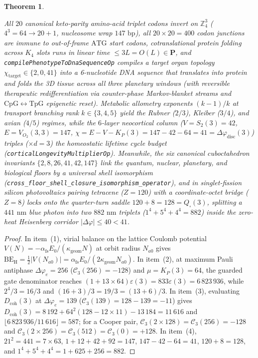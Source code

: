 \documentclass[11pt,a4paper]{article}
\theoremstyle{plain}
\newtheorem{theorem}{Theorem}[section]
\theoremstyle{definition}
\begin{document}
\begin{theorem}
\begin{enumerate}[label=\textbf{(\arabic*)},leftmargin=*]
  All $20$ canonical keto-parity amino-acid triplet codons invert on $\mathbb{Z}_4^3$ ($4^3 = 64 \to 20 + 1$, nucleosome wrap $147\text{ bp}$), all $20\times 20 = 400$ codon junctions are immune to out-of-frame $\mathrm{ATG}$ start codons, cotranslational protein folding across $K_4$ slots runs in linear time $\le 3L = O(L) \in \mathbf{P}$, and \texttt{compilePhenotypeToDnaSequenceOp} compiles a target organ topology $\chi_{\mathrm{target}} \in \{2, 0, 41\}$ into a 6-nucleotide DNA sequence that translates into protein and folds the 3D tissue across all three planetary windows (with reversible therapeutic redifferentiation via counter-phase Markov-blanket streams and $\mathrm{CpG} \leftrightarrow \mathrm{TpG}$ epigenetic reset). Metabolic allometry exponents $(k - 1)/k$ at transport branching rank $k \in \{3, 4, 5\}$ yield the Rubner ($2/3$), Kleiber ($3/4$), and avian ($4/5$) regimes, while the $6$-layer neocortical column ($V = S_2(3) = 42$, $E = V_{O_2}(3,3) = 147$, $\chi = E - V - K_P(3) = 147 - 42 - 64 = 41 = \Delta\varphi_{\mathrm{disc}}(3)$) triples ($\times d = 3$) the homeostatic lifetime cycle budget (\texttt{corticalLongevityMultiplierOp}). Meanwhile, the six canonical cuboctahedron invariants $\{2, 8, 26, 41, 42, 147\}$ link the quantum, nuclear, planetary, and biological floors by a universal shell isomorphism (\texttt{cross\_floor\_shell\_closure\_isomorphism\_operator}), and in singlet-fission silicon photovoltaics pairing tetracene ($Z = 120$) with a coordinate-octet bridge ($Z = 8$) locks onto the quarter-turn saddle $120 + 8 = 128 = Q_\square(3)$, splitting a $441\text{ nm}$ blue photon into two $882\text{ nm}$ triplets ($1^4 + 5^4 + 4^4 = 882$) inside the zero-heat Heisenberg corridor $|\Delta\varphi| \le 40 < 41$.
\end{enumerate}
\end{theorem}

\begin{proof}
In item~(1), virial balance on the lattice Coulomb potential $V(N) = -\alpha_{\mathrm{fs}} E_0 / (\kappa_{\mathrm{geom}} N)$ at orbit radius $N_{a0}$ gives $\mathrm{BE}_{\mathrm{H}} = \frac{1}{2}|V(N_{a0})| = \alpha_{\mathrm{fs}} E_0 / (2\kappa_{\mathrm{geom}} N_{a0})$. In item~(2), at maximum Pauli antiphase $\Delta\varphi_e = 256$ ($\mathcal{C}_3(256) = -128$) and $\mu = K_P(3) = 64$, the guarded gate denominator reaches $(1 + 13\times 64)\varepsilon(3) = 833\varepsilon(3) = 6\,823\,936$, while $2^4 / 3 = 16/3$ and $(16 + 3)/3 = 19/3 = (13 + 6)/3$. In item~(3), evaluating $D_{\mathrm{coh}}(3)$ at $\Delta\varphi_e = 139$ ($\mathcal{C}_3(139) = 128 - 139 = -11$) gives $D_{\mathrm{coh}}(3) = 8\,192 + 64^2(128 - 12\times 11) - 13\,184 = 11\,616$ and $\lfloor 6\,823\,936 / 11\,616\rfloor = 587$; for a Cooper pair, $\mathcal{C}_3(2\times 128) = \mathcal{C}_3(256) = -128$ and $\mathcal{C}_3(2\times 256) = \mathcal{C}_3(512) = \mathcal{C}_3(0) = +128$. In item~(4), $21^2 = 441 = 7\times 63$, $1 + 12 + 42 + 92 = 147$, $147 - 42 - 64 = 41$, $120 + 8 = 128$, and $1^4 + 5^4 + 4^4 = 1 + 625 + 256 = 882$.
\end{proof}
\end{document}
